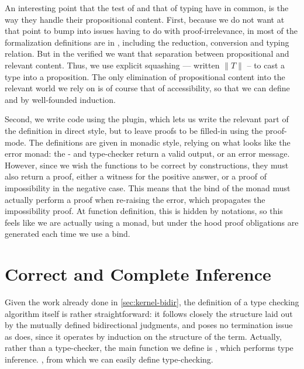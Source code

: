 An interesting point that the test of  and that of typing have in
common, is the way they handle their propositional content. First, because
we do not want at that point to bump into issues having to do with proof-irrelevance,
in most of the formalization definitions are in ,
including the reduction, conversion and typing relation. But in the verified  we want that
separation between propositional and relevant content. Thus, we use explicit squashing —
written $\| T \|$ – to cast a type into a proposition.%
The only elimination of propositional content into the relevant world we rely on is of course that
of accessibility, so that we can define  and  by well-founded induction.

Second, we write code using the  plugin, which lets us write the
relevant part of the definition in direct style, but to leave proofs to be filled-in using the
proof-mode. The definitions are given in monadic style, relying on what looks like the error monad:%
the - and type-checker return a valid output, or an error message. However, since
we wish the functions to be correct by constructions, they must also return a proof, either a
witness for the positive answer, or a proof of impossibility in the negative case.
This means that the bind of the monad must actually perform a proof when re-raising the error,
which propagates the impossibility proof.%
At function definition, this is hidden by notations, so this feels like we are actually using a
monad, but under the hood proof obligations are generated each time we use a bind.

\section{Correct and Complete Inference}
\label{sec:kernel-typing}

Given the work already done in \cref{sec:kernel-bidir}, the definition of a
type checking algorithm 
itself is rather straightforward: it follows closely
the structure laid out by the mutually defined bidirectional judgments, and
poses no termination issue as  does, since it
operates by induction on the structure of the term.
Actually, rather than a type-checker, the main function we define is
, which performs type inference.%
,
from which we can easily define type-checking.

